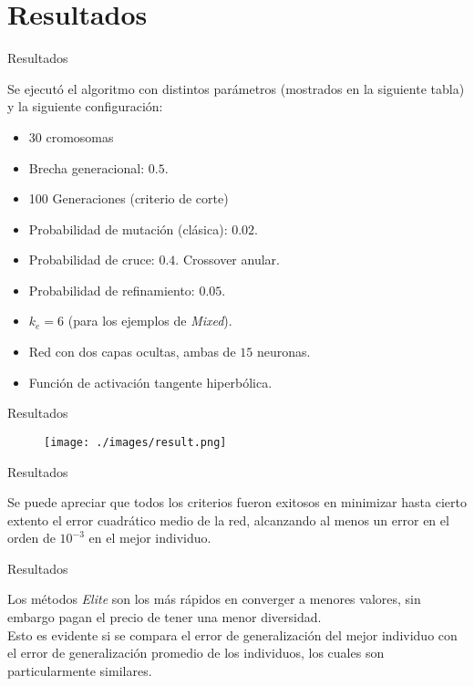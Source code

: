 \documentclass{beamer}
\begin{document}
\section{Resultados}

\begin{frame}{Resultados}
\par Se ejecutó el algoritmo con distintos parámetros (mostrados en la siguiente tabla) y la siguiente configuración:\\
\vspace{3px}
\begin{itemize}
\item 30 cromosomas
\item Brecha generacional: $0.5$.
\item 100 Generaciones (criterio de corte)
\item Probabilidad de mutación (clásica): $0.02$.
\item Probabilidad de cruce: $0.4$. Crossover anular.
\item Probabilidad de refinamiento: $0.05$.
\item $k_e = 6$ (para los ejemplos de \textit{Mixed}).
\item Red con dos capas ocultas, ambas de $15$ neuronas.
\item Función de activación tangente hiperbólica.
\end{itemize}
\end{frame}

\begin{frame}{Resultados}

\begin{figure}[H]
\begin{center}
\texttt{[image: ./images/result.png]}
\label{modelado}
\end{center}
\end{figure}

\end{frame}

\begin{frame}{Resultados}
\par Se puede apreciar que todos los criterios fueron exitosos en minimizar hasta cierto extento el error cuadrático medio de la red, alcanzando al menos 
un error en el orden de $10^{-3}$ en el mejor individuo.
\end{frame}

\begin{frame}{Resultados}
\par Los métodos \textit{Elite} son los más rápidos en converger a menores valores, sin embargo pagan el precio de tener una menor diversidad.\\
\vspace{5px}
Esto es evidente si se compara el error de generalización del mejor individuo con el error de generalización promedio de los individuos, los cuales son particularmente similares.
\end{frame}
\end{document}
